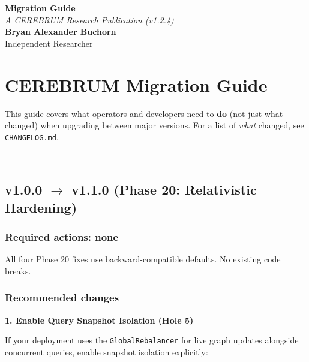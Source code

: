 \documentclass[11pt,article,oneside]{memoir}
\begin{document}
\begin{center}
    \Huge \textbf{Migration Guide} \\
    \vspace{0.5em}
    \large \textit{A CEREBRUM Research Publication (v1.2.4)} \\
    \vspace{1em}
    \large \textbf{Bryan Alexander Buchorn} \\
    Independent Researcher \\
    \vspace{2em}
\end{center}

\begin{abstract}
\textbf{Overview:} This guide provides a conceptual entry point into the CEREBRUM framework. It is designed for practitioners and researchers seeking to understand the core reasoning signals of Framework Implementation Guide.
\end{abstract}

\section{CEREBRUM Migration Guide}

This guide covers what operators and developers need to \textbf{do} (not just what changed) when upgrading between major versions. For a list of \textit{what} changed, see \texttt{CHANGELOG.md}.

---

\subsection{v1.0.0 $\to$ v1.1.0 (Phase 20: Relati\-vistic Hardening)}

\subsubsection{Required actions: none}
All four Phase 20 fixes use backward-compatible defaults. No existing code breaks.

\subsubsection{Recommended changes}

\textbf{1. Enable Query Snapshot Isolation (Hole 5)}

If your deployment uses the \texttt{GlobalRebalancer} for live graph updates alongside concurrent queries, enable snapshot isolation explicitly:
\end{document}
